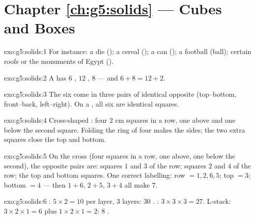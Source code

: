 \section*{Chapter \ref{ch:g5:solids} --- Cubes and Boxes}

\begin{solution}{exo:g5:solids:1}
For instance: a die (); a cereal  (); a can (); a
football (ball); certain roofs or the monuments of Egypt
().
\end{solution}

\begin{solution}{exo:g5:solids:2}
A  has $6$ , $12$ , $8$  --- and
$6 + 8 = 12 + 2$. \checkmark
\end{solution}

\begin{solution}{exo:g5:solids:3}
The six  come in three pairs of identical opposite 
(top--bottom, front--back, left--right). On a , all six 
are identical squares.
\end{solution}

\begin{solution}{exo:g5:solids:4}
Cross-shaped : four $2$ cm squares in a row, one above and one
below the second square. Folding the ring of four makes the sides;
the two extra squares close the top and bottom.
\end{solution}

\begin{solution}{exo:g5:solids:5}
On the cross  (four squares in a row, one above, one below the
second), the opposite pairs are: squares $1$ and $3$ of the row;
squares $2$ and $4$ of the row; the top and bottom squares. One
correct labelling: row $= 1, 2, 6, 5$; top $= 3$; bottom $= 4$
--- then $1{+}6$, $2{+}5$, $3{+}4$ all make $7$.
\end{solution}

\begin{solution}{exo:g5:solids:6}
: $5 \times 2 = 10$ per layer, $3$ layers: $30$ . :
$3 \times 3 \times 3 = 27$. L-stack: $3 \times 2 \times 1 = 6$ plus
$1 \times 2 \times 1 = 2$: $8$ .
\end{solution}

